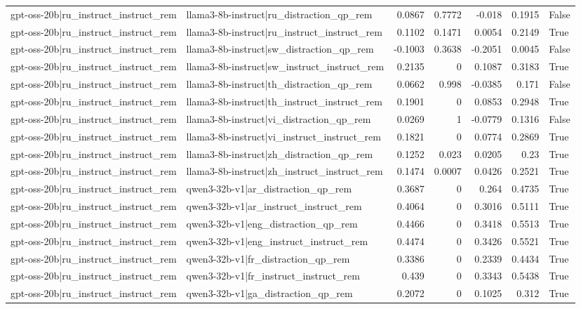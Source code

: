 \begin{table}
\begin{tabular}{l l r r r r l}
gpt-oss-20b|ru_instruct_instruct_rem & llama3-8b-instruct|ru_distraction_qp_rem & 0.0867 & 0.7772 & -0.018 & 0.1915 & False \\
gpt-oss-20b|ru_instruct_instruct_rem & llama3-8b-instruct|ru_instruct_instruct_rem & 0.1102 & 0.1471 & 0.0054 & 0.2149 & True \\
gpt-oss-20b|ru_instruct_instruct_rem & llama3-8b-instruct|sw_distraction_qp_rem & -0.1003 & 0.3638 & -0.2051 & 0.0045 & False \\
gpt-oss-20b|ru_instruct_instruct_rem & llama3-8b-instruct|sw_instruct_instruct_rem & 0.2135 & 0 & 0.1087 & 0.3183 & True \\
gpt-oss-20b|ru_instruct_instruct_rem & llama3-8b-instruct|th_distraction_qp_rem & 0.0662 & 0.998 & -0.0385 & 0.171 & False \\
gpt-oss-20b|ru_instruct_instruct_rem & llama3-8b-instruct|th_instruct_instruct_rem & 0.1901 & 0 & 0.0853 & 0.2948 & True \\
gpt-oss-20b|ru_instruct_instruct_rem & llama3-8b-instruct|vi_distraction_qp_rem & 0.0269 & 1 & -0.0779 & 0.1316 & False \\
gpt-oss-20b|ru_instruct_instruct_rem & llama3-8b-instruct|vi_instruct_instruct_rem & 0.1821 & 0 & 0.0774 & 0.2869 & True \\
gpt-oss-20b|ru_instruct_instruct_rem & llama3-8b-instruct|zh_distraction_qp_rem & 0.1252 & 0.023 & 0.0205 & 0.23 & True \\
gpt-oss-20b|ru_instruct_instruct_rem & llama3-8b-instruct|zh_instruct_instruct_rem & 0.1474 & 0.0007 & 0.0426 & 0.2521 & True \\
gpt-oss-20b|ru_instruct_instruct_rem & qwen3-32b-v1|ar_distraction_qp_rem & 0.3687 & 0 & 0.264 & 0.4735 & True \\
gpt-oss-20b|ru_instruct_instruct_rem & qwen3-32b-v1|ar_instruct_instruct_rem & 0.4064 & 0 & 0.3016 & 0.5111 & True \\
gpt-oss-20b|ru_instruct_instruct_rem & qwen3-32b-v1|eng_distraction_qp_rem & 0.4466 & 0 & 0.3418 & 0.5513 & True \\
gpt-oss-20b|ru_instruct_instruct_rem & qwen3-32b-v1|eng_instruct_instruct_rem & 0.4474 & 0 & 0.3426 & 0.5521 & True \\
gpt-oss-20b|ru_instruct_instruct_rem & qwen3-32b-v1|fr_distraction_qp_rem & 0.3386 & 0 & 0.2339 & 0.4434 & True \\
gpt-oss-20b|ru_instruct_instruct_rem & qwen3-32b-v1|fr_instruct_instruct_rem & 0.439 & 0 & 0.3343 & 0.5438 & True \\
gpt-oss-20b|ru_instruct_instruct_rem & qwen3-32b-v1|ga_distraction_qp_rem & 0.2072 & 0 & 0.1025 & 0.312 & True \\

\end{tabular}
\end{table}
